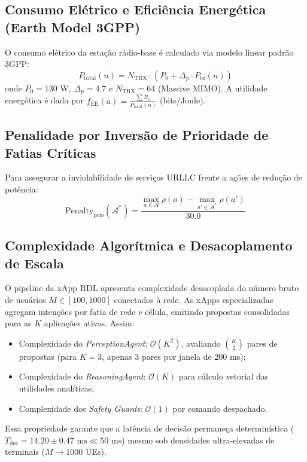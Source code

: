 \documentclass[12pt]{article}
\begin{document}
\subsection{Consumo Elétrico e Eficiência Energética (Earth Model 3GPP)}
O consumo elétrico da estação rádio-base é calculado via modelo linear padrão 3GPP:
\begin{equation}
    P_{\text{total}}(n) = N_{\text{TRX}} \cdot \left( P_0 + \Delta_p \cdot P_{\text{tx}}(n) \right)
\end{equation}
onde $P_0 = 130\text{ W}$, $\Delta_p = 4.7$ e $N_{\text{TRX}} = 64$ (Massive MIMO). A utilidade energética é dada por $f_{\text{EE}}(a) = \frac{\sum R_u}{P_{\text{total}}(n)}$ (bits/Joule).

\subsection{Penalidade por Inversão de Prioridade de Fatias Críticas}
Para assegurar a inviolabilidade de serviços URLLC frente a ações de redução de potência:
\begin{equation}
    \text{Penalty}_{\text{prio}}(\mathcal{A}^*) = \frac{\max_{a \in \mathcal{A}} \rho(a) - \max_{a' \in \mathcal{A}^*} \rho(a')}{30.0}
\end{equation}

\subsection{Complexidade Algorítmica e Desacoplamento de Escala}
O pipeline da xApp RDL apresenta complexidade desacoplada do número bruto de usuários $M \in [100, 1000]$ conectados à rede. As xApps especializadas agregam intenções por fatia de rede e célula, emitindo propostas consolidadas para as $K$ aplicações ativas. Assim:
\begin{itemize}
    \item Complexidade do \textit{PerceptionAgent}: $\mathcal{O}(K^2)$, avaliando $\binom{K}{2}$ pares de propostas (para $K=3$, apenas 3 pares por janela de 200 ms);
    \item Complexidade do \textit{ReasoningAgent}: $\mathcal{O}(K)$ para cálculo vetorial das utilidades analíticas;
    \item Complexidade dos \textit{Safety Guards}: $\mathcal{O}(1)$ por comando despachado.
\end{itemize}
Essa propriedade garante que a latência de decisão permaneça determinística ($T_{\text{dec}} = 14.20 \pm 0.47\text{ ms} \ll 50\text{ ms}$) mesmo sob densidades ultra-elevadas de terminais ($M \to 1000$ UEs).
\end{document}

